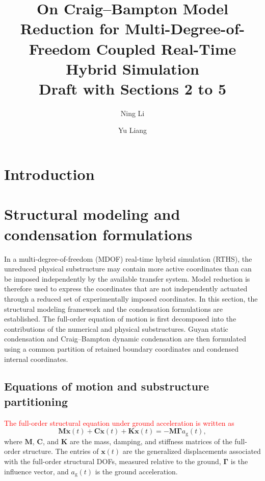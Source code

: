\documentclass[11pt,a4paper]{article}
\title{On Craig--Bampton Model Reduction for Multi-Degree-of-Freedom Coupled Real-Time Hybrid Simulation\\[4pt]
\large Draft with Sections 2 to 5}
\author{Ning Li \and Yu Liang}
\date{}
\numberwithin{equation}{section}
\newcommand{\rev}[1]{\textcolor{red}{#1}}
\begin{document}
\maketitle

\begin{abstract}
	
\end{abstract}

\section{Introduction} \label{sec1}



\section{Structural modeling and condensation formulations} \label{sec2}

In a multi-degree-of-freedom (MDOF) real-time hybrid simulation (RTHS), the unreduced physical substructure may contain more active coordinates than can be imposed independently by the available transfer system. Model reduction is therefore used to express the coordinates that are not independently actuated through a reduced set of experimentally imposed coordinates.
In this section, the structural modeling framework and the condensation formulations are established. The full-order equation of motion is first decomposed into the contributions of the numerical and physical substructures. Guyan static condensation and Craig--Bampton dynamic condensation are then formulated using a common partition of retained boundary coordinates and condensed internal coordinates.

\subsection{Equations of motion and substructure partitioning}
\rev{The full-order structural equation under ground acceleration is written as}
\begin{equation}
	\mathbf{M}\ddot{\bm{x}}(t)+\mathbf{C}\dot{\bm{x}}(t)+\mathbf{K}\bm{x}(t)
	=-\mathbf{M}\bm{\Gamma}a_{\mathrm{g}}(t),
	\label{eq:full-order-eom}
\end{equation}
where \(\mathbf{M}\), \(\mathbf{C}\), and \(\mathbf{K}\) are the mass, damping, and stiffness matrices of the full-order structure. The entries of \(\bm{x}(t)\) are the generalized displacements associated with the full-order structural DOFs, measured relative to the ground, \(\bm{\Gamma}\) is the influence vector, and \(a_{\mathrm{g}}(t)\) is the ground acceleration.
\end{document}
